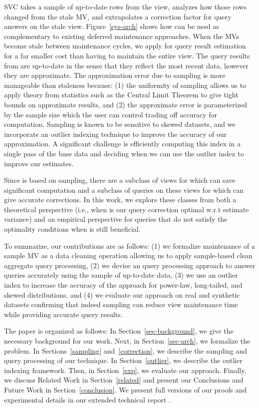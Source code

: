 SVC takes a sample of up-to-date rows from the view, analyzes how those rows changed from the stale MV, and extrapolates a correction factor for query answers on the stale view. Figure~\ref{sys-arch} shows how \svc can be used as complementary to existing deferred maintenance approaches. 
When the MVs become stale between maintenance cycles, we apply \svc for query result estimation for a far smaller cost than having to maintain the entire view.
The query results from \svc are up-to-date in the sense that they reflect the most recent data, however they are approximate. 
The approximation error due to sampling is more manageable than staleness because: (1) the uniformity of sampling allows us to apply theory from statistics such as the Central Limit Theorem to give tight bounds on approximate results, and (2) the approximate error is parameterized by the sample size which the user can control trading off accuracy for computation.
Sampling is known to be sensitive to skewed datasets, and we incorporate an outlier indexing technique to improve the accuracy of our approximation.
A significant challenge is efficiently computing this index in a single pass of the base data and deciding when we can use the outlier index to improve our estimates.


Since \svc is based on sampling, there are a subclass of views for which \svc can save significant computation and a subclass of queries on these views for which \svc can give accurate corrections.
In this work, we explore these classes from both a theoretical perspective (i.e., when is our query correction optimal w.r.t estimate variance) and an empirical perspective for queries that do not satisfy the optimality conditions when is \svc still beneficial.

To summarize, our contributions are as follows: (1) we formalize maintenance of a sample MV as a data cleaning operation allowing us to apply sample-based clean aggregate query processing, (2) we devise an query processing approach to answer queries accurately using the sample of up-to-date data, (3) we use an outlier index to increase the accuracy of the approach for power-law, long-tailed, and skewed distributions, and (4) we evaluate our approach on real and synthetic datasets confirming that indeed sampling can reduce view maintenance time while providing accurate query results. 

The paper is organized as follows: 
In Section~\ref{sec-background}, we give the necessary background for our work.
Next, in Section~\ref{sec-arch}, we formalize the problem.
In Sections~\ref{sampling} and~\ref{correction}, we describe the sampling and query processing of our technique.
In Section~\ref{outlier}, we describe the outlier indexing framework.
Then, in Section~\ref{exp}, we evaluate our approach.
Finally, we discuss Related Work in Section~\ref{related} and present our Conclusions and Future Work in Section~\ref{conclusion}.
We present full versions of our proofs and experimental details in our extended technical report \cite{technicalReport}.
